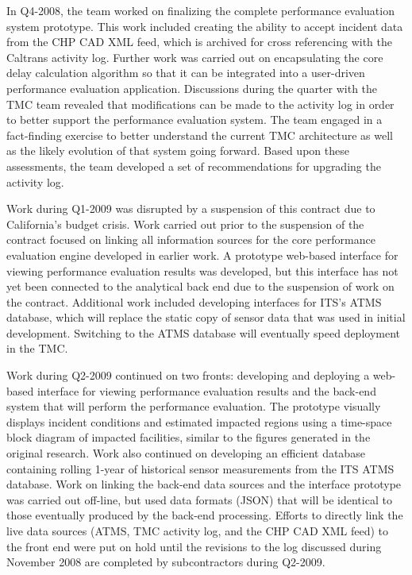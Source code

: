 In Q4-2008, the team worked on finalizing the complete performance evaluation
system prototype. This work included creating the ability to accept incident
data from the CHP CAD XML feed, which is archived for cross referencing with the
Caltrans activity log.  Further work was carried out on encapsulating the core
delay calculation algorithm so that it can be integrated into a user-driven
performance evaluation application.  Discussions during the quarter with the TMC
team revealed that modifications can be made to the activity log in order to
better support the performance evaluation system.  The team engaged in a
fact-finding exercise to better understand the current TMC architecture as well
as the likely evolution of that system going forward. Based upon these
assessments, the team developed a set of recommendations for upgrading the
activity log.

Work during Q1-2009 was disrupted by a suspension of this contract due to
California's budget crisis.  Work carried out prior to the suspension of the
contract focused on linking all information sources for the core performance
evaluation engine developed in earlier work.  A prototype web-based interface
for viewing performance evaluation results was developed, but this interface has
not yet been connected to the analytical back end due to the suspension of work
on the contract.  Additional work included developing interfaces for ITS's ATMS
database, which will replace the static copy of sensor data that was used in
initial development. Switching to the ATMS database will eventually speed
deployment in the TMC.

Work during Q2-2009 continued on two fronts: developing and deploying a
web-based interface for viewing performance evaluation results and the back-end
system that will perform the performance evaluation. The prototype visually
displays incident conditions and estimated impacted regions using a time-space
block diagram of impacted facilities, similar to the figures generated in the
original research. Work also continued on developing an efficient database
containing rolling 1-year of historical sensor measurements from the ITS ATMS
database. Work on linking the back-end data sources and the interface prototype
was carried out off-line, but used data formats (JSON) that will be identical to
those eventually produced by the back-end processing. Efforts to directly link
the live data sources (ATMS, TMC activity log, and the CHP CAD XML feed) to the
front end were put on hold until the revisions to the log discussed during
November 2008 are completed by subcontractors during Q2-2009.

